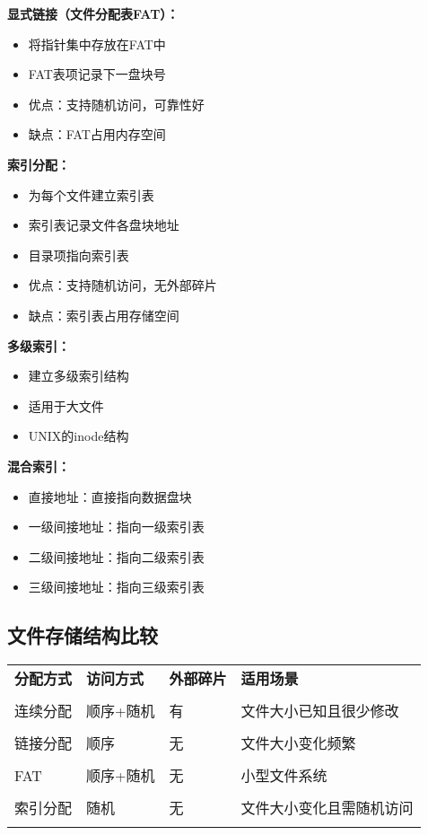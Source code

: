 \documentclass[lang=cn,newtx,10pt,scheme=chinese]{../../elegantbook}
\begin{document}
\textbf{显式链接（文件分配表FAT）：}
\begin{itemize}
  \item 将指针集中存放在FAT中
  \item FAT表项记录下一盘块号
  \item 优点：支持随机访问，可靠性好
  \item 缺点：FAT占用内存空间
\end{itemize}

\textbf{索引分配：}
\begin{itemize}
  \item 为每个文件建立索引表
  \item 索引表记录文件各盘块地址
  \item 目录项指向索引表
  \item 优点：支持随机访问，无外部碎片
  \item 缺点：索引表占用存储空间
\end{itemize}

\textbf{多级索引：}
\begin{itemize}
  \item 建立多级索引结构
  \item 适用于大文件
  \item UNIX的inode结构
\end{itemize}

\textbf{混合索引：}
\begin{itemize}
  \item 直接地址：直接指向数据盘块
  \item 一级间接地址：指向一级索引表
  \item 二级间接地址：指向二级索引表
  \item 三级间接地址：指向三级索引表
\end{itemize}

\subsection{文件存储结构比较}

\begin{longtable}{@{}p{3cm}p{3cm}p{3cm}p{4cm}@{}}
\toprule
\textbf{分配方式} & \textbf{访问方式} & \textbf{外部碎片} & \textbf{适用场景} \\\\ \midrule
\endhead

连续分配 & 顺序+随机 & 有 & 文件大小已知且很少修改 \\\\
链接分配 & 顺序 & 无 & 文件大小变化频繁 \\\\
FAT & 顺序+随机 & 无 & 小型文件系统 \\\\
索引分配 & 随机 & 无 & 文件大小变化且需随机访问 \\\\

\bottomrule
\end{longtable}
\end{document}
